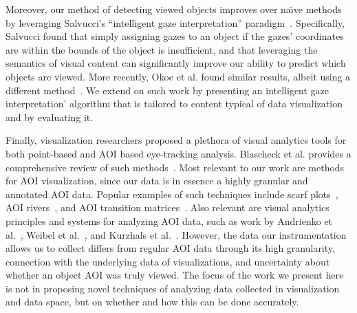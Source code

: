 Moreover, our method of detecting viewed objects improves over na\"{\i}ve methods by leveraging Salvucci's ``intelligent gaze interpretation'' paradigm~\cite{salvucci1999inferring,salvucci2000intelligent}. Specifically, Salvucci found that simply assigning gazes to an object if the gazes' coordinates are within the bounds of the object is insufficient, and that leveraging the semantics of visual content can significantly improve our ability to predict which objects are viewed. More recently, Okoe et al. found similar results, albeit using a different method~\cite{okoe2014gaze,okoe2using}. We extend on such work by presenting an intelligent gaze interpretation' algorithm that is tailored to content typical of data visualization and by evaluating it.
 
Finally, visualization researchers proposed a plethora of visual analytics tools for both point-based and AOI based eye-tracking analysis. Blascheck et al. provides a comprehensive review of such methods~\cite{blascheckstate}. Most relevant to our work are methods for AOI visualization, since our data is in essence a highly granular and annotated AOI data. Popular examples of such techniques include scarf plots~\cite{richardson2005looking}, AOI rivers~\cite{burch2013aoi}, and AOI transition matrices~\cite{goldberg1999computer}. Also relevant are visual analytics principles and systems for analyzing AOI data, such as work by Andrienko et al.~\cite{andrienko2012visual}, Weibel et al.~\cite{weibel2012let}, and Kurzhals et al.~\cite{kurzhals2014iseecube}. However, the data our instrumentation allows us to collect differs from regular AOI data through its high granularity, connection with the underlying data of visualizations, and uncertainty about whether an object AOI was truly viewed. The focus of the work we present here is not in proposing novel techniques of analyzing data collected in visualization and data space, but on whether and how this can be done accurately. 

